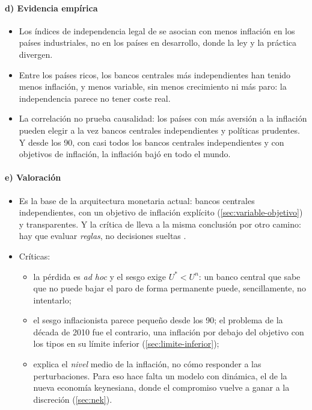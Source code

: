 \documentclass[11pt]{article}
\begin{document}
\paragraph{d) Evidencia empírica}

\begin{itemize}
\item Los índices de independencia legal de \textcite{CukiermanWebbNeyapti1992} se asocian con menos inflación en los países industriales, no en los países en desarrollo, donde la ley y la práctica divergen.
\item Entre los países ricos, los bancos centrales más independientes han tenido menos inflación, y menos variable, sin menos crecimiento ni más paro\nocite{AlesinaSummers1993Central}: la independencia parece no tener coste real.
\item La correlación no prueba causalidad: los países con más aversión a la inflación pueden elegir a la vez bancos centrales independientes y políticas prudentes. Y desde los 90, con casi todos los bancos centrales independientes y con objetivos de inflación, la inflación bajó en todo el mundo.
\end{itemize}

\paragraph{e) Valoración}

\begin{itemize}
\item Es la base de la arquitectura monetaria actual: bancos centrales independientes, con un objetivo de inflación explícito (\ref{sec:variable-objetivo}) y transparentes. Y la crítica de  lleva a la misma conclusión por otro camino: hay que evaluar \emph{reglas}, no decisiones sueltas .
\item Críticas:
  \begin{itemize}
  \item la pérdida es \emph{ad hoc} y el sesgo exige $U^*<U^n$: un banco central que sabe que no puede bajar el paro de forma permanente puede, sencillamente, no intentarlo\nocite{McCallum1995Two};
  \item el sesgo inflacionista parece pequeño desde los 90; el problema de la década de 2010 fue el contrario, una inflación por debajo del objetivo con los tipos en su límite inferior (\ref{sec:limite-inferior});
  \item explica el \emph{nivel} medio de la inflación, no cómo responder a las perturbaciones. Para eso hace falta un modelo con dinámica, el de la nueva economía keynesiana, donde el compromiso vuelve a ganar a la discreción (\ref{sec:nek}).
  \end{itemize}
\end{itemize}
\end{document}
